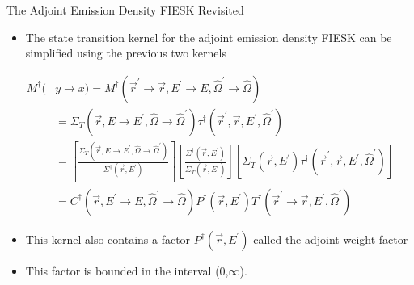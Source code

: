 \documentclass{beamer}
\begin{document}
\begin{frame}{The Adjoint Emission Density FIESK Revisited}
  
  \begin{itemize}
    \item The state transition kernel for the adjoint emission density FIESK 
      can be simplified using the previous two kernels
  \end{itemize}
  \begin{align}
    M^{\dagger}(&y \to x) = M^{\dagger}(\vec{r}^{'} \to \vec{r},E^{'} \to E,
    \hat{\Omega}^{'} \to \hat{\Omega}) \nonumber \\
    & = \Sigma_T(\vec{r},E \to E^{'},\hat{\Omega} \to \hat{\Omega}^{'})
    \tau^{\dagger}(\vec{r}^{'},\vec{r},E^{'},\hat{\Omega}^{'}) \nonumber \\
    & = \left[
      \frac{\Sigma_T(\vec{r},E \to E^{'},\hat{\Omega} \to \hat{\Omega}^{'})}
           {\Sigma^{\dagger}(\vec{r},E^{'})}\right]
    \left[\frac{\Sigma^{\dagger}(\vec{r},E^{'})}{\Sigma_T(\vec{r},E^{'})}\right]
    \left[\Sigma_T(\vec{r},E^{'})
    \tau^{\dagger}(\vec{r}^{'},\vec{r},E^{'},\hat{\Omega}^{'})\right] 
    \nonumber \\
    & = C^{\dagger}(\vec{r},E^{'} \to E,\hat{\Omega}^{'} \to \hat{\Omega})
    P^{\dagger}(\vec{r},E^{'})
    T^{\dagger}(\vec{r}^{'} \to \vec{r},E^{'},\hat{\Omega}^{'}) \nonumber
  \end{align}

  \begin{itemize}
    \item This kernel also contains a factor $P^{\dagger}(\vec{r},E^{'})$ called 
      the adjoint weight factor
      \medskip
    \item This factor is bounded in the interval (0,$\infty$).
  \end{itemize}

\end{frame}
\end{document}
